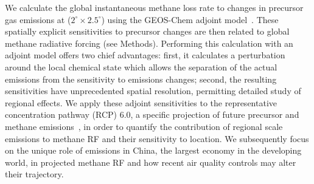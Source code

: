 
 We calculate the global instantaneous methane loss rate to changes in precursor gas emissions at ($2^{\circ}\times 2.5^{\circ}$)  using the GEOS-Chem adjoint model~\citep{ref:henze2007}. These spatially explicit sensitivities to precursor changes are then related to global methane radiative forcing (see Methods). Performing this calculation with an adjoint model offers two chief advantages: first, it calculates a perturbation around the local chemical state which allows the separation of the actual emissions from the sensitivity  to emissions changes; second, the resulting sensitivities have unprecedented spatial resolution, permitting detailed study of regional effects. We apply these adjoint sensitivities to the representative concentration pathway (RCP) 6.0, a specific projection of future precursor and methane emissions~\citep{ref:vanvuuren2011}, in order to quantify the contribution of regional scale emissions to methane RF and their sensitivity to location. We subsequently focus on the unique role of emissions in China, the largest economy in the developing world, in projected methane RF and how recent air quality controls may alter their trajectory.
